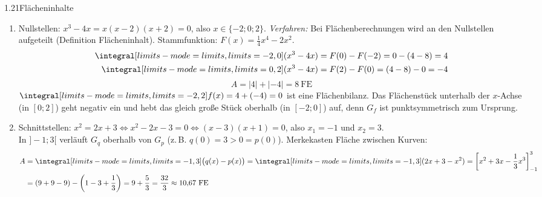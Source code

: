 \begin{loesung}{1.21}{Flächeninhalte}
\begin{enumerate}[label=\alph*)]
  \item Nullstellen: $x^3-4x = x(x-2)(x+2) = 0$, also $x\in\{-2;0;2\}$. \textit{Verfahren:} Bei Flächenberechnungen wird an den Nullstellen aufgeteilt (Definition Flächeninhalt). Stammfunktion: $F(x) = \frac{1}{4}x^4-2x^2$.
  \begin{align*}
    \integral[limits-mode=limits,limits={-2, 0}]{(x^3-4x)} &= F(0)-F(-2) = 0-(4-8) = 4\\
    \integral[limits-mode=limits,limits={0, 2}]{(x^3-4x)} &= F(2)-F(0) = (4-8)-0 = -4
  \end{align*}
  \[A = |4|+|-4| = 8\ \text{FE}\]
  $\integral[limits-mode=limits,limits={-2, 2}]{f(x)} = 4+(-4) = 0$ ist eine Flächenbilanz. Das Flächenstück unterhalb der $x$-Achse (in $[0;2]$) geht negativ ein und hebt das gleich große Stück oberhalb (in $[-2;0]$) auf, denn $G_f$ ist punktsymmetrisch zum Ursprung.
  \item Schnittstellen: $x^2 = 2x+3 \Longleftrightarrow x^2-2x-3 = 0 \Longleftrightarrow (x-3)(x+1) = 0$, also $x_1=-1$ und $x_2=3$.\\
  In $]-1;3[$ verläuft $G_q$ oberhalb von $G_p$ (z.\,B. $q(0)=3>0=p(0)$). Merkekasten \glqq Fläche zwischen Kurven\grqq:
  \begin{align*}
    A &= \integral[limits-mode=limits,limits={-1, 3}]{\big(q(x)-p(x)\big)} = \integral[limits-mode=limits,limits={-1, 3}]{(2x+3-x^2)} = \left[x^2+3x-\dfrac{1}{3}x^3\right]_{-1}^{3}\\
    &= (9+9-9)-\left(1-3+\dfrac{1}{3}\right) = 9+\dfrac{5}{3} = \dfrac{32}{3}\approx 10{,}67\ \text{FE}
  \end{align*}
\end{enumerate}
\end{loesung}

